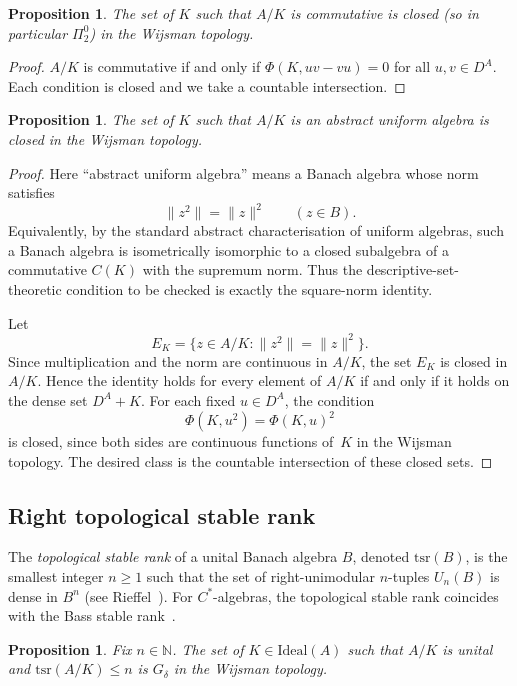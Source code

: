 \documentclass[12pt,fleqn,a4paper]{amsart}
\renewcommand{\le}{\leqslant}
\renewcommand{\ge}{\geqslant}
\numberwithin{equation}{section}
\newtheorem{proposition}[theorem]{Proposition}
\theoremstyle{definition}
\newcommand{\N}{\mathbb{N}}
\newcommand{\Ideal}{\mathrm{Ideal}}
\begin{document}
\begin{proposition}\label{prop:comm}
The set of $K$ such that $A/K$ is commutative is closed (so in particular $\Pi^0_2$) in the Wijsman topology.
\end{proposition}

\begin{proof}
$A/K$ is commutative if and only if $\Phi(K,uv-vu)=0$ for all $u,v\in D^A$.
Each condition is closed and we take a countable intersection.
\end{proof}

\begin{proposition}\label{prop:unif}
The set of $K$ such that $A/K$ is an abstract uniform algebra is closed in the Wijsman
topology.
\end{proposition}

\begin{proof}
Here ``abstract uniform algebra'' means a Banach algebra whose norm satisfies
\[
        \|z^2\|=\|z\|^2 \qquad(z\in B).
\]
Equivalently, by the standard abstract characterisation of uniform algebras, such a
Banach algebra is isometrically isomorphic to a closed subalgebra of a commutative
$C(K)$ with the supremum norm.  Thus the descriptive-set-theoretic condition to be
checked is exactly the square-norm identity.

Let
\[
        E_K=\{z\in A/K:\|z^2\|=\|z\|^2\}.
\]
Since multiplication and the norm are continuous in $A/K$, the set $E_K$ is closed in
$A/K$.  Hence the identity holds for every element of $A/K$ if and only if it holds on
the dense set $D^A+K$.  For each fixed $u\in D^A$, the condition
\[
        \Phi(K,u^2)=\Phi(K,u)^2
\]
is closed, since both sides are continuous functions of~$K$ in the Wijsman topology.
The desired class is the countable intersection of these closed sets.
\end{proof}

\subsection{Right topological stable rank}

The \emph{topological stable rank} of a unital Banach algebra $B$, denoted $\mathrm{tsr}(B)$,
is the smallest integer $n\ge 1$ such that the set of right-unimodular $n$-tuples
$U_n(B)$ is dense in $B^n$ (see Rieffel~\cite{Rieffel1983}).  For $C^*$-algebras, the
topological stable rank coincides with the Bass stable
rank~\cite{HermanVaserstein1984}.

\begin{proposition}\label{prop:tsr}
Fix $n\in\N$.  The set of $K\in\Ideal(A)$ such that $A/K$ is unital and
$\mathrm{tsr}(A/K)\le n$ is $G_\delta$ in the Wijsman topology.
\end{proposition}
\end{document}
